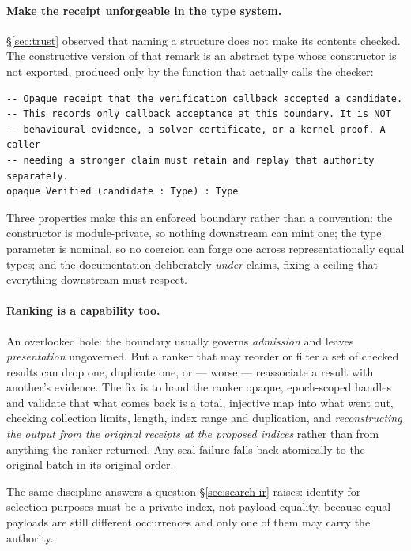 \paragraph{Make the receipt unforgeable in the type system.}
\S\ref{sec:trust} observed that naming a structure  does not
make its contents checked. The constructive version of that remark is an
abstract type whose constructor is not exported, produced only by the function
that actually calls the checker:

\begin{lstlisting}
-- Opaque receipt that the verification callback accepted a candidate.
-- This records only callback acceptance at this boundary. It is NOT
-- behavioural evidence, a solver certificate, or a kernel proof. A caller
-- needing a stronger claim must retain and replay that authority separately.
opaque Verified (candidate : Type) : Type
\end{lstlisting}

Three properties make this an enforced boundary rather than a convention: the
constructor is module-private, so nothing downstream can mint one; the type
parameter is nominal, so no coercion can forge one across representationally
equal types; and the documentation deliberately \emph{under}-claims, fixing a
ceiling that everything downstream must respect.

\paragraph{Ranking is a capability too.}
An overlooked hole: the boundary usually governs \emph{admission} and leaves
\emph{presentation} ungoverned. But a ranker that may reorder or filter a set
of checked results can drop one, duplicate one, or --- worse --- reassociate a
result with another's evidence. The fix is to hand the ranker opaque,
epoch-scoped handles and validate that what comes back is a total, injective
map into what went out, checking collection limits, length, index range and
duplication, and \emph{reconstructing the output from the original receipts at
the proposed indices} rather than from anything the ranker returned. Any seal
failure falls back atomically to the original batch in its original order.

The same discipline answers a question \S\ref{sec:search-ir} raises: identity
for selection purposes must be a private index, not payload equality, because
equal payloads are still different occurrences and only one of them may carry
the authority.

